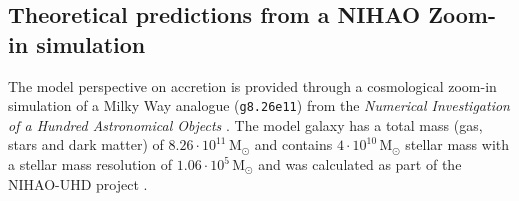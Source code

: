 \documentclass[fleqn,usenatbib]{mnras}
\newcommand{\Gaia}{\textit{Gaia}\xspace} %
\begin{document}




\subsection{Theoretical predictions from a NIHAO Zoom-in simulation}\label{sec:sim_data}

The model perspective on accretion is provided through a cosmological zoom-in simulation of a Milky Way analogue (\texttt{g8.26e11}) from the \textit{Numerical Investigation of a Hundred Astronomical Objects} \citep[NIHAO,][]{Wang2015}. The model galaxy has a total mass (gas, stars and dark matter) of $8.26 \cdot 10^{11}\,\mathrm{M_\odot}$ and contains $4 \cdot 10^{10}\,\mathrm{M_\odot}$ stellar mass with a stellar mass resolution of $1.06 \cdot 10^{5}\,\mathrm{M_\odot}$ \citep{Buck2021} and was calculated as part of the NIHAO-UHD project \citep{Buck2020b}.
\end{document}
